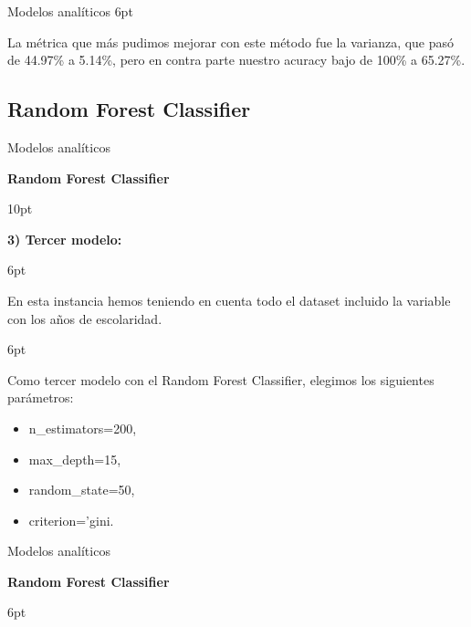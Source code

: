 \documentclass[pdf]{beamer}
\def\vspace{}%
\begin{document}
{\begin{frame}{Modelos analíticos}
\vspace{6pt}
    
    La métrica que más pudimos mejorar con este método fue la varianza, que pasó de 44.97\% a 5.14\%, pero en contra parte nuestro acuracy bajo de 100\% a 65.27\%.

\end{frame}

    \subsection{Random Forest Classifier}

\begin{frame}{Modelos analíticos}

    
    \begin{Large}
        \textbf{Random Forest Classifier}
    \end{Large}

\vspace{10pt}

    \textbf{3) Tercer modelo:}
    
\vspace{6pt}

    En esta instancia hemos teniendo en cuenta todo el dataset incluido la variable con los años de escolaridad. 
    
\vspace{6pt}

    Como tercer modelo con el Random Forest Classifier, elegimos los siguientes parámetros:
    \begin{itemize}
        \item n\_estimators=200,
        \item max\_depth=15,
        \item random\_state=50,
        \item criterion='gini.
    \end{itemize}

\end{frame}

\begin{frame}{Modelos analíticos}

    \begin{Large}
        \textbf{Random Forest Classifier}
    \end{Large}
\vspace{6pt}
    

\end{frame}}
\end{document}
